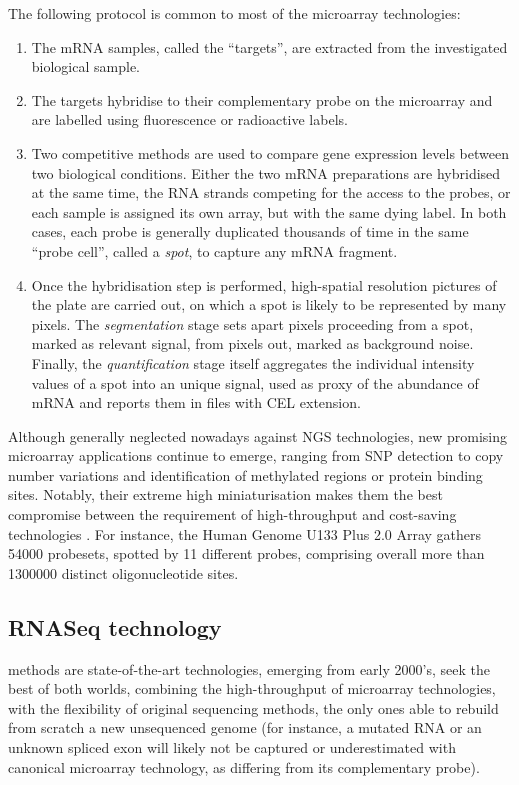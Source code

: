 The following protocol is common to most of the microarray technologies:
\begin{enumerate}
    \item The mRNA samples, called the \enquote{targets}, are extracted from the investigated biological sample. 
    \item The targets hybridise to their complementary probe on the microarray and are labelled using fluorescence or radioactive labels. 
    \item Two competitive methods are used to compare gene expression levels between two biological conditions. Either the two mRNA preparations are hybridised at the same time, the RNA strands competing for the access to the probes, or each sample is assigned its own array, but with the same dying label. In both cases, each probe is generally duplicated thousands of time in the  same \enquote{probe cell}, called a \textit{spot}, to capture any mRNA fragment.
    \item Once the hybridisation step is performed, high-spatial resolution pictures of the plate are carried out, on which a spot is likely to be represented by many pixels. The \textit{segmentation} stage sets apart pixels proceeding from a spot, marked as relevant signal, from pixels out, marked as background noise. Finally, the \textit{quantification} stage itself aggregates the individual intensity values of a spot into an unique signal, used as proxy of the abundance of mRNA and reports them in files with CEL extension.
\end{enumerate}

Although generally neglected nowadays against NGS technologies, new promising microarray applications continue to emerge, ranging from SNP detection to copy number variations and identification of methylated regions or protein binding sites. Notably, their extreme high miniaturisation makes them the best compromise between the requirement of high-throughput and cost-saving technologies . For instance, the Human Genome U133 Plus 2.0 Array gathers \num{54000} probesets, spotted by 11 different probes,  comprising overall more than \num{1300000} distinct oligonucleotide sites.


\subsection{RNASeq technology}
\label{subsec:RNASeq}
 methods are state-of-the-art technologies, emerging from early 2000's, seek the best of both worlds, combining the high-throughput of microarray technologies, with the flexibility of original sequencing methods, the only ones able to rebuild from scratch a new unsequenced genome (for instance, a mutated RNA or an unknown spliced exon will likely not be captured or underestimated with canonical microarray technology, as differing from its complementary probe). 



